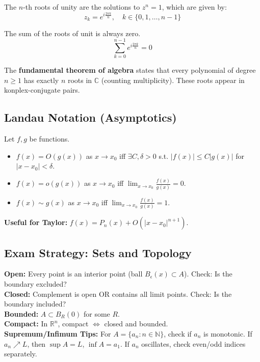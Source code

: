 \begin{definition}
    The $n$-th roots of unity are the solutions to $z^n = 1$, which are given by:
    $$z_k = e^{i\frac{2\pi k}{n}}, \quad k \in \{0, 1, \dots, n-1\}$$
\end{definition}

\begin{theorem}
    The sum of the roots of unit is always zero.
    $$\sum_{k=0}^{n-1} e^{i\frac{2\pi k}{n}} = 0$$
\end{theorem}

\begin{theorem}
    The \textbf{fundamental theorem of algebra} states that every polynomial of degree $n \geq 1$ has exactly $n$ roots in $\mathbb{C}$ (counting multiplicity). These roots appear in konplex-conjugate pairs.
\end{theorem}
\subsection{Landau Notation (Asymptotics)}
\begin{definition}
    Let $f, g$ be functions.
    \begin{itemize}
        \item $f(x) = O(g(x))$ as $x \to x_0$ iff $\exists C, \delta > 0$ s.t. $|f(x)| \le C|g(x)|$ for $|x-x_0| < \delta$.
        \item $f(x) = o(g(x))$ as $x \to x_0$ iff $\lim_{x \to x_0} \frac{f(x)}{g(x)} = 0$.
        \item $f(x) \sim g(x)$ as $x \to x_0$ iff $\lim_{x \to x_0} \frac{f(x)}{g(x)} = 1$.
    \end{itemize}
\end{definition}

\begin{remark}
    \textbf{Useful for Taylor:} $f(x) = P_n(x) + O(|x-x_0|^{n+1})$.
\end{remark}

\subsection{Exam Strategy: Sets and Topology}
\textbf{Open:} Every point is an interior point (ball $B_\epsilon(x) \subset A$). Check: Is the boundary excluded? \\
\textbf{Closed:} Complement is open OR contains all limit points. Check: Is the boundary included? \\
\textbf{Bounded:} $A \subset B_R(0)$ for some $R$. \\
\textbf{Compact:} In $\mathbb{R}^n$, compact $\iff$ closed and bounded. \\
\textbf{Supremum/Infimum Tips:} For $A = \{a_n : n \in \mathbb{N}\}$, check if $a_n$ is monotonic. If $a_n \nearrow L$, then $\sup A = L$, $\inf A = a_1$. If $a_n$ oscillates, check even/odd indices separately.

